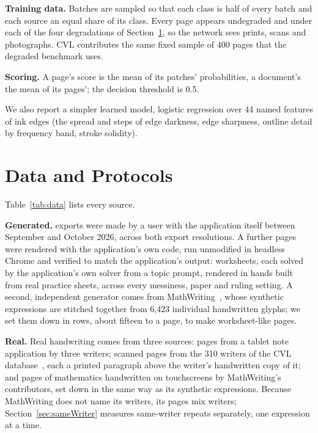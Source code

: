 \documentclass[conference]{IEEEtran}
\begin{document}
\textbf{Training data.} Batches are sampled so that each class is half of every batch and each source an equal share of
its class. Every page appears undegraded and under each of the four degradations of Section~\ref{sec:data}, so the
network sees prints, scans and photographs. CVL contributes the same fixed sample of 400 pages that the degraded
benchmark uses.

\textbf{Scoring.} A page's score is the mean of its patches' probabilities, a document's the mean of its pages'; the
decision threshold is 0.5.

We also report a simpler learned model, logistic regression over 44 named features of ink edges (the spread and steps
of edge darkness, edge sharpness, outline detail by frequency band, stroke solidity).

\section{Data and Protocols}
\label{sec:data}



Table~\ref{tab:data} lists every source.

\textbf{Generated.} \NumExports{} exports were made by a user with the application itself between September and October
2026, across both export resolutions. A further \NumRenders{} pages were rendered with the application's own code, run
unmodified in headless Chrome and verified to match the application's output: \NumWorksheets{} worksheets, each solved by
the application's own solver from a topic prompt, rendered in \NumHands{} hands built from real practice sheets, across
every messiness, paper and ruling setting. A second, independent generator comes from MathWriting~\cite{gervais2024mathwriting},
whose synthetic expressions are stitched together from 6{,}423 individual handwritten glyphs; we set them down in rows,
about fifteen to a page, to make worksheet-like pages.

\textbf{Real.} Real handwriting comes from three sources: pages from a tablet note application by three writers;
\NumCVLPages{} scanned pages from the 310 writers of the CVL database~\cite{kleber2013cvl}, each a printed paragraph
above the writer's handwritten copy of it; and pages of mathematics handwritten on touchscreens by MathWriting's
contributors, set down in the same way as its synthetic expressions. Because MathWriting does not name its writers, its
pages mix writers; Section~\ref{sec:sameWriter} measures same-writer repeats separately, one expression at a time.
\end{document}
